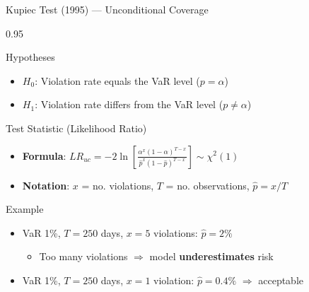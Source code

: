 \documentclass[9pt, aspectratio=169, t]{beamer}
\begin{document}
\begin{frame}{Kupiec Test (1995) --- Unconditional Coverage}
\small
    \begin{cminipage}{0.95\textwidth}
    \begin{block}{Hypotheses}
        \begin{itemize}\setlength{\itemsep}{0pt}
            \item $H_0$: Violation rate equals the VaR level ($p = \alpha$)
            \item $H_1$: Violation rate differs from the VaR level ($p \neq \alpha$)
        \end{itemize}
    \end{block}
    \vspace{-0.1cm}
    \begin{block}{Test Statistic (Likelihood Ratio)}
        \begin{itemize}\setlength{\itemsep}{0pt}
            \item \textbf{Formula}:
            $LR_{uc} = -2 \ln \left[ \frac{\alpha^x (1-\alpha)^{T-x}}{\hat{p}^x (1-\hat{p})^{T-x}} \right] \sim \chi^2(1)$
            \item \textbf{Notation}: $x$ = no. violations, $T$ = no. observations, $\hat{p} = x/T$
        \end{itemize}
    \end{block}
    \vspace{-0.1cm}
    \begin{exampleblock}{Example}
        \begin{itemize}\setlength{\itemsep}{0pt}
            \item VaR 1\%, $T = 250$ days, $x = 5$ violations: $\hat{p} = 2\%$
                \begin{itemize}\setlength{\itemsep}{0pt}
                    \item Too many violations $\Rightarrow$ model \textbf{underestimates} risk
                \end{itemize}
            \item VaR 1\%, $T = 250$ days, $x = 1$ violation: $\hat{p} = 0.4\%$ $\Rightarrow$ acceptable
        \end{itemize}
    \end{exampleblock}
    \end{cminipage}
\end{frame}
\end{document}
